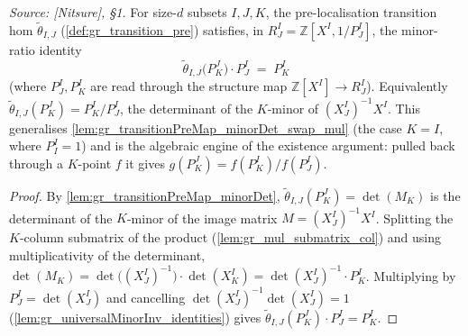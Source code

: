 \begin{lemma}

  \label{lem:gr_transitionPreMap_minorDet_mul}
  \textit{Source: [Nitsure], \S 1.}
  For size-\(d\) subsets \(I, J, K\), the pre-localisation transition hom
  \(\tilde\theta_{I,J}\) (\cref{def:gr_transition_pre}) satisfies, in \(R^I_J =
  \mathbb{Z}[X^I, 1/P^I_J]\), the minor-ratio identity
  \[
    \tilde\theta_{I,J}\bigl(P^J_K\bigr)\cdot P^I_J \;=\; P^I_K
  \]
  (where \(P^I_J, P^I_K\) are read through the structure map \(\mathbb{Z}[X^I] \to
  R^I_J\)). Equivalently \(\tilde\theta_{I,J}(P^J_K) = P^I_K / P^I_J\), the
  determinant of the \(K\)-minor of \((X^I_J)^{-1} X^I\). This generalises
  \cref{lem:gr_transitionPreMap_minorDet_swap_mul} (the case \(K = I\), where
  \(P^I_I = 1\)) and is the algebraic engine of the existence argument: pulled back
  through a \(K\)-point \(f\) it gives \(g(P^J_K) = f(P^I_K)/f(P^I_J)\).
\end{lemma}
\begin{proof}
    \leanok
  By \cref{lem:gr_transitionPreMap_minorDet}, \(\tilde\theta_{I,J}(P^J_K) =
  \det(M_K)\) is the determinant of the \(K\)-minor of the image matrix \(M =
  (X^I_J)^{-1} X^I\). Splitting the \(K\)-column submatrix of the product
  (\cref{lem:gr_mul_submatrix_col}) and using multiplicativity of the determinant,
  \(\det(M_K) = \det\bigl((X^I_J)^{-1}\bigr)\cdot \det(X^I_K) =
  \det(X^I_J)^{-1}\cdot P^I_K\). Multiplying by \(P^I_J = \det(X^I_J)\) and
  cancelling \(\det(X^I_J)^{-1}\det(X^I_J) = 1\)
  (\cref{lem:gr_universalMinorInv_identities}) gives
  \(\tilde\theta_{I,J}(P^J_K)\cdot P^I_J = P^I_K\).
\end{proof}

